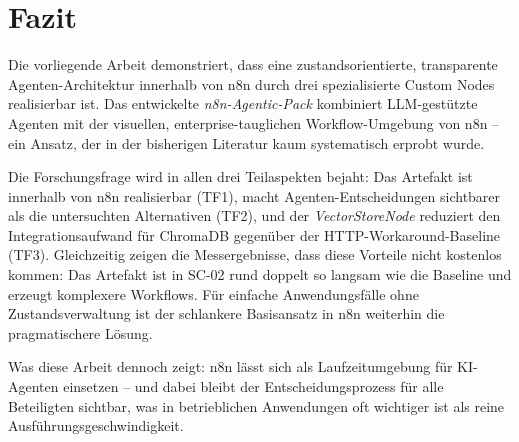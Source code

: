 \documentclass[12pt,a4paper,oneside]{report}
\begin{document}
\section{Fazit}

Die vorliegende Arbeit demonstriert, dass eine zustandsorientierte, transparente
Agenten-Architektur innerhalb von n8n durch drei spezialisierte Custom Nodes realisierbar
ist. Das entwickelte \textit{n8n-Agentic-Pack} kombiniert \ac{LLM}-gestützte Agenten
mit der visuellen, enterprise-tauglichen Workflow-Umgebung von n8n -- ein Ansatz, der
in der bisherigen Literatur kaum systematisch erprobt wurde.

Die Forschungsfrage wird in allen drei Teilaspekten bejaht: Das Artefakt ist innerhalb
von n8n realisierbar (TF1), macht Agenten-Entscheidungen sichtbarer als die untersuchten
Alternativen (TF2), und der \textit{VectorStoreNode} reduziert den Integrationsaufwand
für ChromaDB gegenüber der HTTP-Workaround-Baseline (TF3). Gleichzeitig zeigen die
Messergebnisse, dass diese Vorteile nicht kostenlos kommen: Das Artefakt ist in
SC-02 rund doppelt so langsam wie die Baseline und erzeugt komplexere Workflows.
Für einfache Anwendungsfälle ohne Zustandsverwaltung ist der schlankere Basisansatz
in n8n weiterhin die pragmatischere Lösung.

Was diese Arbeit dennoch zeigt: n8n lässt sich als Laufzeitumgebung für KI-Agenten
einsetzen -- und dabei bleibt der Entscheidungsprozess für alle Beteiligten sichtbar,
was in betrieblichen Anwendungen oft wichtiger ist als reine Ausführungsgeschwindigkeit.

\newpage
{}
\renewcommand{\bibname}{Literaturverzeichnis}
\end{document}
